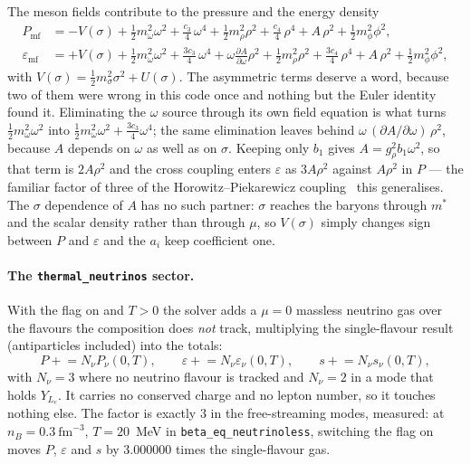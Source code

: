 \documentclass[aps,prc,onecolumn,superscriptaddress,nofootinbib,10pt]{revtex4-2}
\newcommand{\nB}{n_B}
\newcommand{\meff}[1]{m^{*}_{#1}}
\begin{document}
The meson fields contribute to the pressure and the energy density
%
\begin{align}
P_{\mathrm{mf}} &= -V(\sigma)
   + \tfrac12 m_\omega^2 \omega^2 + \tfrac{c_3}{4}\, \omega^4
   + \tfrac12 m_\rho^2 \rho^2 + \tfrac{c_4}{4}\, \rho^4 + A\, \rho^2
   + \tfrac12 m_\phi^2 \phi^2 ,
\label{eq:Pmf}\\
\varepsilon_{\mathrm{mf}} &= +V(\sigma)
   + \tfrac12 m_\omega^2 \omega^2 + \tfrac{3 c_3}{4}\, \omega^4
   + \omega \frac{\partial A}{\partial \omega} \rho^2
   + \tfrac12 m_\rho^2 \rho^2 + \tfrac{3 c_4}{4}\, \rho^4 + A\, \rho^2
   + \tfrac12 m_\phi^2 \phi^2 ,
\label{eq:epsmf}
\end{align}
%
with $V(\sigma) = \tfrac12 m_\sigma^2 \sigma^2 + U(\sigma)$. The asymmetric
terms deserve a word, because two of them were wrong in this code once and
nothing but the Euler identity found it. Eliminating the $\omega$ source
through its own field equation is what turns $\tfrac12 m_\omega^2 \omega^2$
into $\tfrac12 m_\omega^2 \omega^2 + \tfrac{3c_3}{4}\omega^4$; the same
elimination leaves behind $\omega\,(\partial A/\partial\omega)\,\rho^2$,
because $A$ depends on $\omega$ as well as on $\sigma$. Keeping only $b_1$
gives $A = g_\rho^2 b_1 \omega^2$, so that term is $2A\rho^2$ and the cross
coupling enters $\varepsilon$ as $3A\rho^2$ against $A\rho^2$ in $P$ --- the
familiar factor of three of the Horowitz--Piekarewicz
coupling~\cite{HorowitzPiekarewicz2001} this generalises. The $\sigma$
dependence of $A$ has no such partner: $\sigma$ reaches the baryons through
$\meff{}$ and the scalar density rather than through $\mu$, so $V(\sigma)$
simply changes sign between $P$ and $\varepsilon$ and the $a_i$ keep
coefficient one.

\paragraph{The \texttt{thermal\_neutrinos} sector.} With the flag on and
$T > 0$ the solver adds a $\mu = 0$ massless neutrino gas over the flavours
the composition does \emph{not} track, multiplying the single-flavour result
(antiparticles included) into the totals:
%
\begin{equation}
P \mathrel{+}= N_\nu P_\nu(0, T) , \qquad
\varepsilon \mathrel{+}= N_\nu \varepsilon_\nu(0, T) , \qquad
s \mathrel{+}= N_\nu s_\nu(0, T) ,
\label{eq:thermalnu}
\end{equation}
%
with $N_\nu = 3$ where no neutrino flavour is tracked and $N_\nu = 2$ in a
mode that holds $Y_{L_e}$. It carries no conserved charge and no lepton
number, so it touches nothing else. The factor is exactly $3$ in the
free-streaming modes, measured: at $\nB = 0.3\ \mathrm{fm}^{-3}$,
$T = 20$~MeV in \texttt{beta\_eq\_neutrinoless}, switching the flag on moves
$P$, $\varepsilon$ and $s$ by $3.000000$ times the single-flavour gas.
\end{document}
